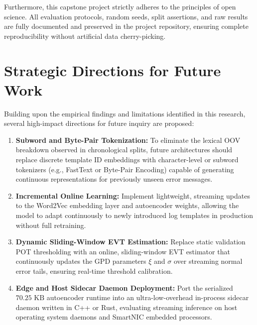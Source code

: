 Furthermore, this capstone project strictly adheres to the principles of open science. All evaluation protocols, random seeds, split assertions, and raw results are fully documented and preserved in the project repository, ensuring complete reproducibility without artificial data cherry-picking.

\section{Strategic Directions for Future Work}
\label{sec:conclusion_future_work}
Building upon the empirical findings and limitations identified in this research, several high-impact directions for future inquiry are proposed:
\begin{enumerate}
    \item \textbf{Subword and Byte-Pair Tokenization:} To eliminate the lexical OOV breakdown observed in chronological splits, future architectures should replace discrete template ID embeddings with character-level or subword tokenizers (e.g., FastText or Byte-Pair Encoding) capable of generating continuous representations for previously unseen error messages.
    \item \textbf{Incremental Online Learning:} Implement lightweight, streaming updates to the Word2Vec embedding layer and autoencoder weights, allowing the model to adapt continuously to newly introduced log templates in production without full retraining.
    \item \textbf{Dynamic Sliding-Window EVT Estimation:} Replace static validation POT thresholding with an online, sliding-window EVT estimator that continuously updates the GPD parameters $\xi$ and $\sigma$ over streaming normal error tails, ensuring real-time threshold calibration.
    \item \textbf{Edge and Host Sidecar Daemon Deployment:} Port the serialized $70.25\text{ KB}$ autoencoder runtime into an ultra-low-overhead in-process sidecar daemon written in C++ or Rust, evaluating streaming inference on host operating system daemons and SmartNIC embedded processors.
\end{enumerate}

